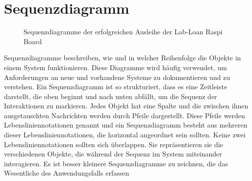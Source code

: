 \section{Sequenzdiagramm}
\label{sec:design:sequenz}
\begin{figure}
	\centering
	\caption{Sequenzdiagramme der erfolgreichen Ausleihe der Lab-Loan Raspi Board}
	\label{fig:seq}
\end{figure}
Sequenzdiagramme beschreiben, wie und in welcher Reihenfolge die Objekte in einem System funktionieren. Diese Diagramme wird häufig verwendet, um Anforderungen an neue und vorhandene Systeme zu dokumentieren und zu verstehen. Ein Sequenzdiagramm ist so strukturiert, dass es eine Zeitleiste darstellt, die oben beginnt und nach unten abfällt, um die Sequenz der Interaktionen zu markieren. Jedes Objekt hat eine Spalte und die zwischen ihnen ausgetauschten Nachrichten werden durch Pfeile dargestellt. Diese Pfeile werden Lebensliniennotationen genannt und ein Sequenzdiagramm besteht aus mehreren dieser Lebensliniennotationen, die horizontal angeordnet sein sollten. Keine zwei Lebensliniennotationen sollten sich überlappen. Sie repräsentieren sie die verschiedenen Objekte, die während der Sequenz im System miteinander interagieren. Es ist besser kleinere Sequenzdiagramme zu zeichnen, die das Wesentliche des Anwendungsfalls erfassen
